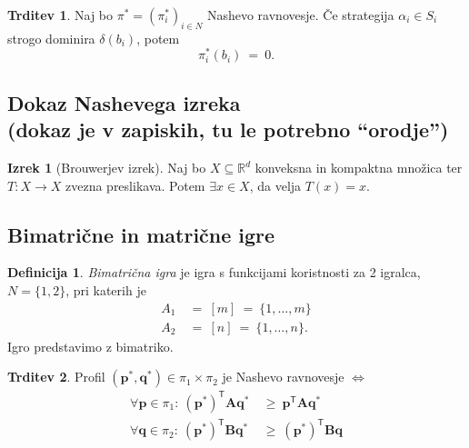 \documentclass[11pt]{article}
\newcommand{\R}{\mathbb{R}}
\newcommand{\set}[1]{\{#1\}}
\newcommand{\T}{\textsf{T}}
\newcommand{\p}{\mathbf{p}}
\newcommand{\q}{\mathbf{q}}
\renewcommand{\AA}{\mathbf{A}}
\newcommand{\BB}{\mathbf{B}}
\theoremstyle{definition}
\newtheorem{definicija}{Definicija}[section]
\theoremstyle{definition}
\newtheorem{trditev}{Trditev}[section]
\theoremstyle{definition}
\newtheorem{izrek}{Izrek}[section]
\theoremstyle{definition}
\begin{document}
\begin{trditev}

Naj bo $\pi^* = (\pi_i^*)_{i \in N}$ Nashevo ravnovesje. Če strategija \hbox{$\alpha_i \in S_i$} strogo dominira $\delta(b_i)$, potem 
$$\pi_i^*(b_i) ~=~ 0.$$

\end{trditev}
\vspace{0.5cm}


\subsection{Dokaz Nashevega izreka \\(dokaz je v zapiskih, tu le potrebno ``orodje'')}
\vspace{0.5cm}

\begin{izrek}[Brouwerjev izrek]

Naj bo $X \subseteq \R^d$ konveksna in kompaktna množica ter $T: X \rightarrow X$ zvezna preslikava. Potem $\exists x \in X$, da velja \hbox{$T(x) = x$}.

\end{izrek}
\vspace{0.5cm}


\subsection{Bimatrične in matrične igre}
\vspace{0.5cm}

\begin{definicija}

\textit{Bimatrična igra} je igra s funkcijami koristnosti za 2 igralca, $N = \set{1,2}$, pri katerih je
\begin{align*}
A_1 ~&=~ [m] ~=~ \set{1,\ldots,m} \\
A_2 ~&=~ [n] ~=~ \set{1,\ldots,n}.
\end{align*}
Igro predstavimo z bimatriko.

\end{definicija}
\vspace{0.5cm}

\begin{trditev}

Profil $(\p^*,\q^*) \in \pi_1 \times \pi_2$ je Nashevo ravnovesje $\iff$
\begin{align*}
\forall \p \in \pi_1: ~(\p^*)^\T \AA \q^* ~&\geq~ \p^\T \AA \q^* \\
\forall \q \in \pi_2: ~(\p^*)^\T \BB \q^* ~&\geq~ (\p^*)^\T \BB \q
\end{align*}

\end{trditev}
\vspace{0.5cm}
\end{document}
